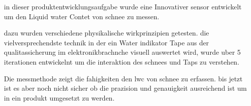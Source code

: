 


in dieser produktentwicklungsaufgabe wurde eine Innovativer sensor entwickelt um den Liquid water Contet von schnee zu messen.

dazu wurden verschiedene physikalische wirkprinzipien getesten. die vielversprechendste technik in der ein Water indikator Tape aus der qualitassicherung im elektronikbrachnche visuell auswertet wird, wurde uber 5 iterationen entwickelnt um die interaktion des schnees und Taps zu verstehen.


Die messmethode zeigt die fahigkeiten den lwc von schnee zu erfassen. bis jetzt ist es aber noch nicht sicher ob die prazision und genauigkeit ausreichend ist um in ein produkt umgesetzt zu werden.
